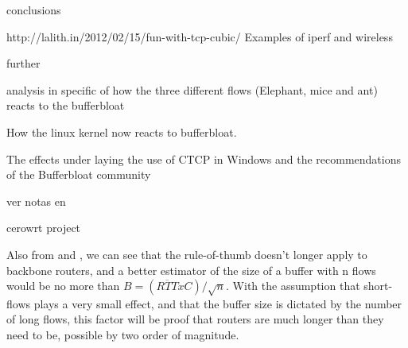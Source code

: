 conclusions

http://lalith.in/2012/02/15/fun-with-tcp-cubic/
Examples of iperf and wireless 

\cite{MathisMacroCAA}

further

analysis in specific of how the three different flows (Elephant, mice and ant)\cite{HaElephants} \cite{evolvshortlongflows} reacts to the bufferbloat

How the linux kernel now reacts to bufferbloat. \cite{TokeLinux}

The effects under laying the use of CTCP\cite{Tan06compoundtcp}\cite{4146841} in Windows and the recommendations of the Bufferbloat community\cite{windowstips}

ver notas en \cite{MathisMacroCAA}

cerowrt project \cite{cerowrt}

Also from \cite{main:ref:1} and \cite{Vu-Brugier}, we can see that the rule-of-thumb doesn't longer apply to backbone routers, and a better estimator of the size of a buffer with n flows would be no more than $B = (\overline{RTT}xC)/\sqrt{n}$. With the assumption that short-flows plays a very small effect, and that the buffer size is dictated by the number of long flows, this factor will be proof that routers are much longer than they need to be, possible by two order of magnitude.